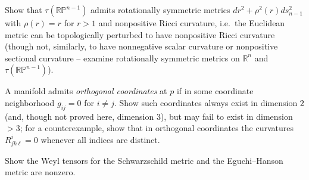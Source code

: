 \begin{remark}
  \label{rem:pet-ch4-ex-25}
  Show that $\tau(\mathbb{RP}^{n-1})$ admits rotationally symmetric metrics
  $dr^2+\rho^2(r)ds_{n-1}^2$ with $\rho(r)=r$ for $r>1$ and nonpositive Ricci
  curvature, i.e.\ the Euclidean metric can be topologically perturbed to have
  nonpositive Ricci curvature (though not, similarly, to have nonnegative
  scalar curvature or nonpositive sectional curvature -- examine rotationally
  symmetric metrics on $\mathbb{R}^n$ and $\tau(\mathbb{RP}^{n-1})$).
\end{remark}

\begin{remark}
  \label{rem:pet-ch4-ex-26}
  A manifold admits \emph{orthogonal coordinates} at $p$ if in some coordinate
  neighborhood $g_{ij}=0$ for $i\ne j$. Show such coordinates always exist in
  dimension $2$ (and, though not proved here, dimension $3$), but may fail to
  exist in dimension $>3$; for a counterexample, show that in orthogonal
  coordinates the curvatures $R^i_{jk\ell}=0$ whenever all indices are
  distinct.
\end{remark}

\begin{remark}
  \label{rem:pet-ch4-ex-27}
  Show the Weyl tensors for the Schwarzschild metric and the Eguchi--Hanson
  metric are nonzero.
\end{remark}

